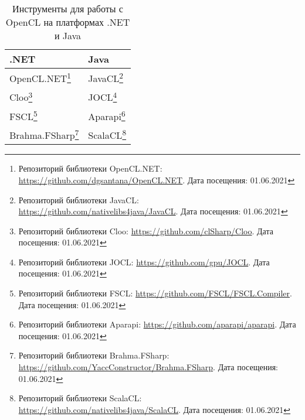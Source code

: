 \begin{table}
    \begin{minipage}{\linewidth}
    \begin{tabularx}{\textwidth}{X|X}
    .NET & Java \\
    \hline
    OpenCL.NET\footnote{Репозиторий библиотеки OpenCL.NET: \url{https://github.com/dgsantana/OpenCL.NET}. Дата посещения: 01.06.2021} & JavaCL\footnote{Репозиторий библиотеки JavaCL: \url{https://github.com/nativelibs4java/JavaCL}. Дата посещения: 01.06.2021} \\
    Cloo\footnote{Репозиторий библиотеки Cloo: \url{https://github.com/clSharp/Cloo}. Дата посещения: 01.06.2021} & JOCL\footnote{Репозиторий библиотеки JOCL: \url{https://github.com/gpu/JOCL}. Дата посещения: 01.06.2021} \\
    FSCL\footnote{Репозиторий библиотеки FSCL: \url{https://github.com/FSCL/FSCL.Compiler}. Дата посещения: 01.06.2021} & Aparapi\footnote{Репозиторий библиотеки Aparapi: \url{https://github.com/aparapi/aparapi}. Дата посещения: 01.06.2021} \\
    Brahma.FSharp\footnote{Репозиторий библиотеки Brahma.FSharp: \url{https://github.com/YaccConstructor/Brahma.FSharp}. Дата посещения: 01.06.2021} & ScalaCL\footnote{Репозиторий библиотеки ScalaCL: \url{https://github.com/nativelibs4java/ScalaCL}. Дата посещения: 01.06.2021} \\
    \hline
  \end{tabularx}
  \end{minipage}
  \caption{Инструменты для работы с OpenCL на платформах .NET и Java}
  \label{tab:opencl_comparison}
\end{table}
